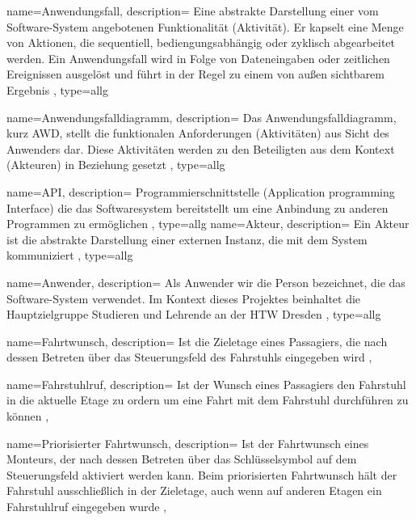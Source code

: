 

{
	name=Anwendungsfall,
	description={
		Eine abstrakte Darstellung einer vom Software-System angebotenen \newline Funktionalität (Aktivität). Er kapselt eine Menge von Aktionen, die sequentiell, bediengungsabhängig oder zyklisch abgearbeitet werden. Ein Anwendungsfall wird in Folge von Dateneingaben oder zeitlichen Ereignissen ausgelöst und führt in der Regel zu einem von au{\ss}en sichtbarem Ergebnis
		},
	type=allg
}

{
	name=Anwendungsfalldiagramm,
	description={
		Das Anwendungsfalldiagramm, kurz AWD, stellt die funktionalen Anforderungen (Aktivitäten) aus Sicht des Anwenders dar. Diese Aktivitäten werden zu den Beteiligten aus dem Kontext (Akteuren) in Beziehung gesetzt
		},
	type=allg
}

{
	name=API,
	description={
		Programmierschnittstelle (Application programming Interface) die das Softwaresystem bereitstellt um eine Anbindung zu anderen Programmen zu ermöglichen
	},
	type=allg
}
{
	name=Akteur,
	description={
		Ein Akteur ist die abstrakte Darstellung einer externen Instanz, die mit dem System kommuniziert
	},
	type=allg
}

{
	name=Anwender,
	description={
		Als Anwender wir die Person bezeichnet, die das Software-System verwendet. Im Kontext dieses Projektes beinhaltet die Hauptzielgruppe Studieren und Lehrende an der HTW Dresden
	},
	type=allg
}

{
	name=Fahrtwunsch,
	description={
		Ist die Zieletage eines \gls{Passagier}s, die nach dessen Betreten über das \gls{Steuerungsfeld} des Fahrstuhls eingegeben wird
		},
}

{
	name=Fahrstuhlruf,
	description={
		Ist der Wunsch eines \gls{Passagier}s den Fahrstuhl in die aktuelle Etage zu ordern um eine Fahrt mit dem Fahrstuhl durchführen zu können
	},
}

{
	name=Priorisierter Fahrtwunsch,
	description={
		Ist der \gls{Fahrtwunsch} eines \gls{Monteur}s, der nach dessen Betreten über das Schlüsselsymbol auf dem \gls{Steuerungsfeld} aktiviert werden kann. Beim priorisierten Fahrtwunsch hält der Fahrstuhl ausschließlich in der Ziel\-etage, auch wenn auf anderen Etagen ein \gls{Fahrstuhlruf} eingegeben wurde
	},
}

